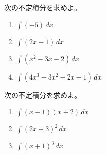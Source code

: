 \begin{multicols*}{4}
 \columnbreak{}
 
 次の不定積分を求めよ。
 
 \begin{enumerate}
  \item $\displaystyle\int (-5)\,dx$
	\begin{ansBlockSize}{6}
	\end{ansBlockSize}
  \item $\displaystyle\int (2x-1)\,dx$
	\begin{ansBlockSize}{6}
	\end{ansBlockSize}
  \item $\displaystyle\int (x^2-3x-2)\,dx$
	\begin{ansBlockSize}{6}
	\end{ansBlockSize}
  \item $\displaystyle\int (4x^3-3x^2-2x-1)\,dx$
	\begin{ansBlockSize}{6}
	\end{ansBlockSize}
 \end{enumerate}
 
 次の不定積分を求めよ。
 
 \begin{enumerate}
  \item $\displaystyle\int (x-1)(x+2)\,dx$
	\begin{ansBlockSize}{10}
	\end{ansBlockSize}
  \item $\displaystyle\int (2x+3)^2\,dx$
	\begin{ansBlockSize}{10}
	\end{ansBlockSize}
  \item $\displaystyle\int (x+1)^3\,dx$
	\begin{ansBlockSize}{10}
	\end{ansBlockSize}
 \end{enumerate}
 
 \columnbreak{}
 
 \vfill
 
 

\end{multicols*}
